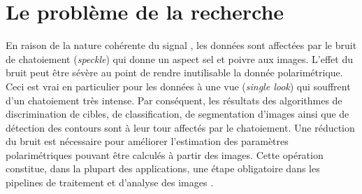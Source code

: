 \section{Le problème de la recherche}


En raison de la nature cohérente du signal \acrsarns, les données \acrpolsar sont affectées par le bruit de chatoiement (\textit{speckle}) qui donne un aspect sel et poivre aux images.  L’effet du bruit peut être sévère au point de rendre inutilisable la donnée polarimétrique. Ceci est vrai en particulier pour les données à une vue (\textit{single look}) qui souffrent d’un chatoiement très intense. Par conséquent, les résultats des algorithmes de discrimination de cibles, de classification, de segmentation d’images ainsi que de détection des contours sont à leur tour affectés par le chatoiement. Une réduction du bruit est nécessaire pour améliorer l’estimation des paramètres polarimétriques pouvant être calculés à partir des images. Cette opération constitue, dans la plupart des applications, une étape obligatoire dans les pipelines de traitement et d’analyse des images \acrpolsarns. 




